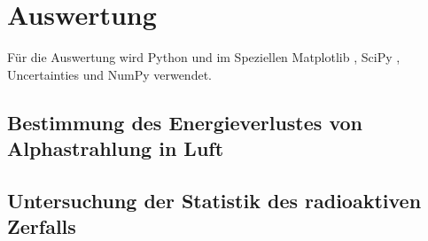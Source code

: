 \section{Auswertung}
\label{sec:Auswertung}

Für die Auswertung wird Python und im Speziellen Matplotlib \cite{matplotlib}, SciPy \cite{scipy}, Uncertainties \cite{uncertainties} und NumPy \cite{numpy} verwendet.

\subsection{Bestimmung des Energieverlustes von Alphastrahlung in Luft}




\subsection{Untersuchung der Statistik des radioaktiven Zerfalls}




